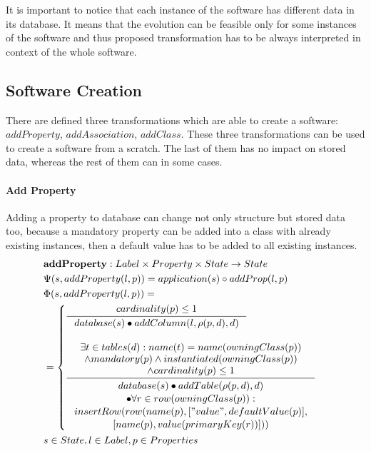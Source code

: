 \documentclass[11pt]{article}
\begin{document}
It is important to notice that each instance of the software has different data in its database. It means that the evolution can be feasible only for some instances of the software and thus proposed transformation has to be always interpreted in context of the whole software.


\subsection{Software Creation}
There are defined three transformations which are able to create a software: $addProperty$, $addAssociation$,  $addClass$. These three transformations can be used to create a software from a scratch. The last of them has no impact on stored data, whereas the rest of them can in some cases.
\paragraph{Add Property} Adding a property to database can change not only structure but stored data too, because a mandatory property can be added into a class with already existing instances, then a default value has to be added to all existing instances.
\begin{align*}
&	\mathbf{addProperty} : Label \times Property \times State \rightarrow State \\
&	\Psi(s, addProperty(l, p)) = application(s) \circ addProp(l,p) \\
&	\Phi(s, addProperty(l, p)) = \\
& = \begin{cases}
    		\inference{cardinality(p) \leq 1}{database(s) \bullet addColumn(l, \rho(p,d), d)} \\ \\
	    \inference{ \exists t \in tables(d) : name(t) = name(owningClass(p)) \\ \wedge mandatory(p) \wedge instantiated(owningClass(p)) \\ \wedge cardinality(p) \leq 1}{\begin{gathered}
   database(s) \bullet addTable(\rho(p,d), d) \\ \bullet \forall r \in row(owningClass(p)) :\\ insertRow(row(name(p), ["value", defaultValue(p)], \\ [name(p), value(primaryKey(r))])) 
    \end{gathered} } 
   \end{cases}\\
&	s \in State, l \in Label, p \in Properties
\end{align*}
\end{document}
